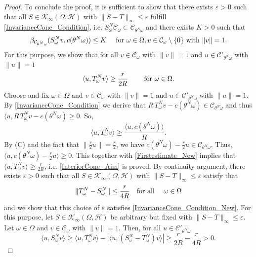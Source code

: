 \documentclass[pdflatex,sn-mathphys-num]{sn-jnl}%
\theoremstyle{thmstyleone}%
\theoremstyle{thmstyletwo}%
\theoremstyle{thmstylethree}%
\newcommand{\cH}{\mathcal{H}}
\newcommand{\cC}{\mathcal{C}}
\newcommand{\eps}{\varepsilon}
\numberwithin{equation}{section}
\begin{document}
\begin{proof}
To conclude the proof, it is sufficient to show that there exists $\eps>0$ such that all $S\in \mathcal K_{\infty}(\Omega,\cH)$ with $\|S-T\|_{\infty}\leq \eps$ fulfill \eqref{InvarianceCone_Condition}, i.e. $S^N_{\omega}\mathcal C_{\omega}\subset \mathcal C_{\theta^N \omega}$ and there exists $K>0$ such that 
\begin{equation}\label{InvarianceCone_Condition_New}
\beta_{\mathcal C_{\theta^N\omega}}(S^N_{\omega}v, c(\theta^N\omega))\leq K\quad \hbox{ for } \omega\in\Omega, v\in \mathcal C_{\omega}\setminus\{0\} \hbox{ with } \|v\|=1.
\end{equation}
For this purpose, we show that   for all $v\in\cC_{\omega}$ with $\|v\|=1$ and $u\in\cC'_{\theta^N\omega}$ with $\|u\|=1$
\begin{equation}\label{InteriorCone_Aim}
\langle u, T^N_{\omega}v\rangle \geq \frac{r}{2R}\qquad\hbox{ for } \omega\in\Omega.   
\end{equation}
Choose and fix $\omega\in \Omega$ and $v\in \mathcal C_{\omega}$ with $\|v\|=1$ and $u\in\cC'_{\theta^N\omega}$ with $\|u\|=1$. By \eqref{InvarianceCone_Condition} we derive that $R\,T^N_{\omega}v-c(\theta^N\omega)\in \cC_{\theta^N\omega}$ and thus $\langle u,R\,T^N_{\omega}v-c(\theta^N\omega)\geq 0$. So,
\begin{equation}\label{Firstestimate_New}
 \langle u, T^N_{\omega}v\rangle\geq \frac{\langle u, c(\theta^N\omega)\rangle}{R}.
\end{equation}
By (C) and the fact that $\|\frac{r}{2}u\|=\frac{r}{2}$, we have $c(\theta^N\omega)-\frac{r}{2} u\in \cC_{\theta^N\omega}$. Thus, $\langle u,c(\theta^N\omega)-\frac{r}{2}u\rangle\geq 0$. This together with \eqref{Firstestimate_New} implies that $\langle u, T^N_{\omega}v\rangle\geq\frac{r}{2R}$, i.e. \eqref{InteriorCone_Aim} is proved. By continuity argument, there exists $\eps>0$ such that all $S\in \mathcal K_{\infty}(\Omega,\cH)$ with $\|S-T\|_{\infty}\leq \eps$ satisfy that 
\begin{equation}\label{ChoiceofEpsilon}
\|T^N_{\omega}-S^N_{\omega}\|\leq \frac{r}{4R}\quad \hbox{for all }\quad  \omega\in\Omega
\end{equation}
and we show that this choice of $\eps$ satisfies \eqref{InvarianceCone_Condition_New}. For this purpose, let $S\in \mathcal K_{\infty}(\Omega,\cH)$ be arbitrary but fixed with $\|S-T\|_{\infty}\leq \eps$. Let $\omega\in \Omega$ and $v\in \mathcal C_{\omega}$ with $\|v\|=1$. Then, for all $u\in \cC'_{\theta^N\omega}$ 
\[
\langle u,S^N_{\omega}v\rangle \geq 
\langle u,T^N_{\omega}v\rangle-\left|\langle u,(S^N_\omega-T^N_{\omega})v\rangle \right|\geq \frac{r}{2R}-\frac{r}{4R}>0.
\]
\end{proof}
\end{document}
